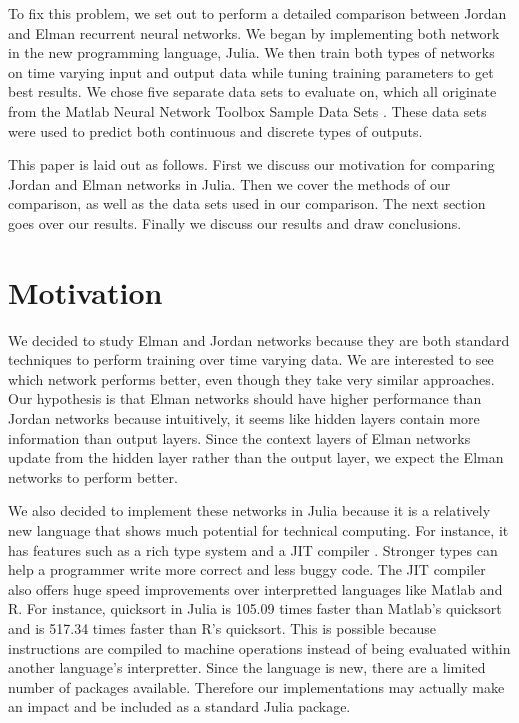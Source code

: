\documentclass{acm_proc_article-sp}
\begin{document}
To fix this problem, we set out to perform a detailed comparison between Jordan and Elman recurrent neural networks. 
We began by implementing both network in the new programming language, Julia. 
We then train both types of networks on time varying input and output data while tuning training parameters to get best results. 
We chose five separate data sets to evaluate on, which all originate from the Matlab Neural Network Toolbox Sample Data Sets \cite{data}. 
These data sets were used to predict both continuous and discrete types of outputs.

This paper is laid out as follows. First we discuss our motivation for comparing Jordan and Elman networks in Julia. %
Then we cover the methods of our comparison, as well as the data sets used in our comparison. The next section goes over our results. Finally we discuss our results and draw conclusions.

\section{Motivation}
We decided to study Elman and Jordan networks because they are both standard techniques to perform training over time varying data. 
We are interested to see which network performs better, even though they take very similar approaches. 
Our hypothesis is that Elman networks should have higher performance than Jordan networks because intuitively, it seems like hidden layers contain more information than output layers. Since the context layers of Elman networks update from the hidden layer rather than the output layer, we expect the Elman networks to perform better. 

We also decided to implement these networks in Julia because it is a relatively new language that shows much potential for technical computing. 
For instance, it has features such as a rich type system and a JIT compiler \cite{julia}. 
Stronger types can help a programmer write more correct and less buggy code. 
The JIT compiler also offers huge speed improvements over interpretted languages like Matlab and R. 
For instance, quicksort in Julia is 105.09 times faster than Matlab's quicksort and is 517.34 times faster than R's quicksort. 
This is possible because instructions are compiled to machine operations instead of being evaluated within another language's interpretter.
Since the language is new, there are a limited number of packages available. Therefore our implementations may actually make an impact and be included as a standard Julia package. 
\end{document}
